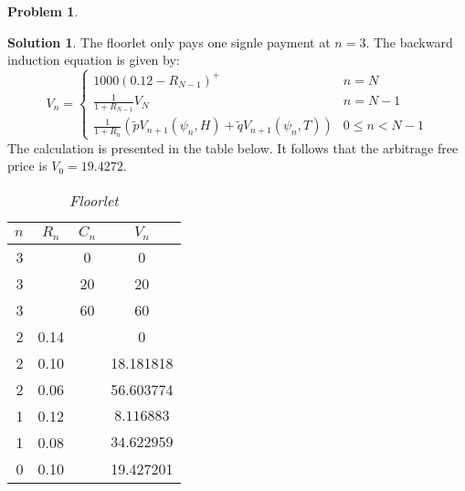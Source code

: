 \documentclass[a4paper, 10pt]{article}
\renewcommand{\arraystretch}{1.4}
\theoremstyle{definition}
\newtheorem{problem}{Problem}
\theoremstyle{hSol}
\newtheorem*{solution}{Solution}
\begin{document}
\begin{problem} 
\end{problem}
\begin{solution} The floorlet only pays one signle payment at $n=3$. The backward induction equation is given by:
\begin{equation}
  V_n = \begin{cases}
  1000(0.12 - R_{N-1})^+ & n=N\\
  \frac{1}{1+R_{N-1}}V_N & n=N-1\\
  \frac{1}{1+R_n}(\tilde{p}V_{n+1}(\psi_n, H)+\tilde{q}V_{n+1}(\psi_n, T)) & 0\leq n<N-1
  \end{cases}
\end{equation}
The calculation is presented in the table below. It follows that the arbitrage free price is $V_0=19.4272$.
\begin{table}[h]
\vspace{-1pt}
\caption{\textit{Floorlet}}
\vspace{-7pt}
\centering
\def\arraystretch{1.15}
\begin{tabular}{|r|ccc|}
\hline
$n$ & $R_n$ & $C_n$ & $V_n$\\ 
\hline
3 &  & 0 & 0\\
3 &  & 20 & 20\\
3 &  & 60 & 60 \\
\hline
2 & 0.14 &  & 0\\
2 & 0.10 &  & 18.181818\\
2 & 0.06 &  & 56.603774\\
\hline
1 & 0.12 &  & $8.116883$\\
1 & 0.08 & & $34.622959$\\
\hline
0 & 0.10 &  & 19.427201\\
\hline
\end{tabular}
\label{tab:put}
\end{table}
\end{solution}
\end{document}
